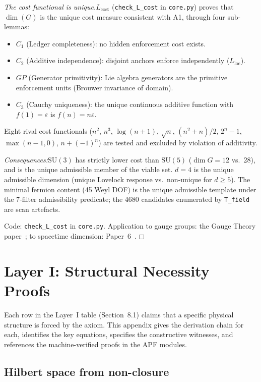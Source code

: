 \documentclass[11pt]{article}
\providecommand{\square}{\ensuremath{\mdlgwhtsquare}}
\newcommand{\eps}{\varepsilon}
\newcommand{\Lloc}{L_{\mathrm{loc}}}
\newcommand{\SU}{\mathrm{SU}}
\begin{document}
\textit{The cost functional is unique.}\quad $L_{\mathrm{cost}}$ (\texttt{check\_L\_cost} in \texttt{core.py}) proves that $\dim(G)$ is the unique cost measure consistent with A1, through four sub-lemmas:
\begin{itemize}[nosep,leftmargin=2em]
\item $C_1$ (Ledger completeness): no hidden enforcement cost exists.
\item $C_2$ (Additive independence): disjoint anchors enforce independently ($\Lloc$).
\item $GP$ (Generator primitivity): Lie algebra generators are the primitive enforcement units (Brouwer invariance of domain).
\item $C_3$ (Cauchy uniqueness): the unique continuous additive function with $f(1) = \eps$ is $f(n) = n\eps$.
\end{itemize}
Eight rival cost functionals ($n^2$, $n^3$, $\log(n{+}1)$, $\sqrt{n}$, $(n^2{+}n)/2$, $2^n{-}1$, $\max(n{-}1,0)$, $n{+}(-1)^n$) are tested and excluded by violation of additivity.

\textit{Consequences:}\quad $\SU(3)$ has strictly lower cost than $\SU(5)$ ($\dim G = 12$ vs.\ 28), and is the unique admissible member of the viable set.  $d = 4$ is the unique admissible dimension (unique Lovelock response vs.\ non-unique for $d \ge 5$).  The minimal fermion content (45 Weyl DOF) is the unique admissible template under the 7-filter admissibility predicate; the 4680 candidates enumerated by \texttt{T\_field} are scan artefacts.

Code: \texttt{check\_L\_cost} in \texttt{core.py}.  Application to gauge groups: the Gauge Theory paper~\cite{PGT}; to spacetime dimension: Paper~6~\cite{P6}. \hfill$\square$


\section{Layer I: Structural Necessity Proofs}

Each row in the Layer~I table (Section~8.1) claims that a specific physical structure is forced by the axiom.  This appendix gives the derivation chain for each, identifies the key equations, specifies the constructive witnesses, and references the machine-verified proofs in the APF modules.

\subsection{Hilbert space from non-closure}
\end{document}
